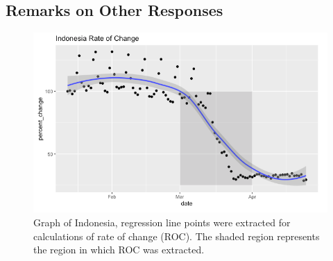 \documentclass[11pt, english]{article}
\begin{document}
\subsection{Remarks on Other Responses}
\begin{figure}[h!]
  \includegraphics[width=\linewidth]{image3.png}
  \caption{Graph of Indonesia, regression line points were extracted for calculations of rate of change (ROC). The shaded region represents the region in which ROC was extracted.}
  \label{fig:regression}
\end{figure}
\end{document}

